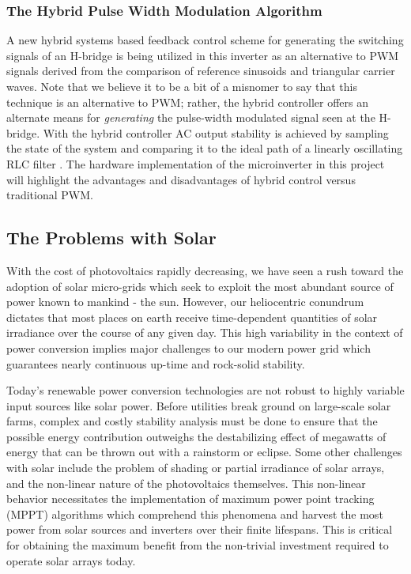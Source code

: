 \subsubsection{The Hybrid Pulse Width Modulation Algorithm}
A new hybrid systems based feedback control scheme for generating the switching signals of an H-bridge is being utilized in this inverter as an alternative to PWM signals derived from the comparison of reference sinusoids and triangular carrier waves. Note that we believe it to be a bit of a misnomer to say that this technique is an alternative to PWM; rather, the hybrid controller offers an alternate means for \emph{generating} the pulse-width modulated signal seen at the H-bridge. 
With the hybrid controller AC output stability is achieved by sampling the state of the system and comparing it to the ideal path of a linearly oscillating RLC filter \cite{ricardo}. The hardware implementation of the microinverter in this project will highlight the advantages and disadvantages of hybrid control versus traditional PWM.

\subsection{The Problems with Solar}
With the cost of photovoltaics rapidly decreasing, we have seen a rush toward the adoption of solar micro-grids which seek to exploit the most abundant source of power known to mankind - the sun. However, our heliocentric conundrum dictates that most places on earth receive time-dependent quantities of solar irradiance over the course of any given day. This high variability in the context of power conversion implies major challenges to our modern power grid which guarantees nearly continuous up-time and rock-solid stability. 

Today's renewable power conversion technologies are not robust to highly variable input sources like solar power. Before utilities break ground on large-scale solar farms, complex and costly stability analysis must be done to ensure that the possible energy contribution outweighs the destabilizing effect of megawatts of energy that can be thrown out with a rainstorm or eclipse. Some other challenges with solar include  the problem of shading or partial irradiance of solar arrays, and the non-linear nature of the photovoltaics themselves. This non-linear behavior necessitates the implementation of maximum power point tracking (MPPT) algorithms which comprehend this phenomena and harvest the most power from solar sources and inverters over their finite lifespans. This is critical for obtaining the maximum benefit from the non-trivial investment required to operate solar arrays today. 

